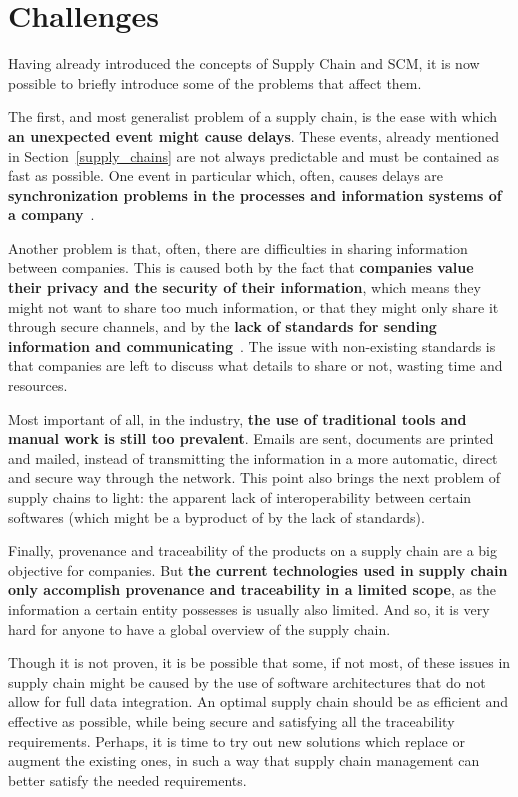 \section{Challenges}
\label{sec:supply-chain-challenges}

 Having already introduced the concepts of Supply Chain and SCM, it is now possible to briefly introduce some of the problems that affect them.

The first, and most generalist problem of a supply chain, is the ease with which \textbf{an unexpected event might cause delays}. These events, already mentioned in Section~\ref{supply_chains} are not always predictable and must be contained as fast as possible. One event in particular which, often, causes delays are \textbf{synchronization problems in the processes and information systems of a company}~\cite{Prokle2017}. 

    Another problem is that, often, there are difficulties in sharing information between companies. This is caused both by the fact that \textbf{companies value their privacy and the security of their information}, which means they might not want to share too much information, or that they might only share it through secure channels, and by the \textbf{lack of standards for sending information and communicating}~\cite{Korpela2017}. The issue with non-existing standards is that companies are left to discuss what details to share or not, wasting time and resources.

Most important of all, in the industry, \textbf{the use of traditional tools and manual work is still too prevalent}. Emails are sent, documents are printed and mailed, instead of transmitting the information in a more automatic, direct and secure way through the network. This point also brings the next problem of supply chains to light: the apparent lack of interoperability between certain softwares (which might be a byproduct of by the lack of standards).
 
 
Finally, provenance and traceability of the products on a supply chain are a big objective for companies. But \textbf{the current technologies used in supply chain only accomplish provenance and traceability in a limited scope}, as the information a certain entity possesses is usually also limited. And so, it is very hard for anyone to have a global overview of the supply chain.

Though it is not proven, it is be possible that some, if not most, of these issues in supply chain might be caused by the use of software architectures that do not allow for full data integration. An optimal supply chain should be as efficient and effective as possible, while being secure and satisfying all the traceability requirements. Perhaps, it is time to try out new solutions which replace or augment the existing ones, in such a way that supply chain management can better satisfy the needed requirements.

